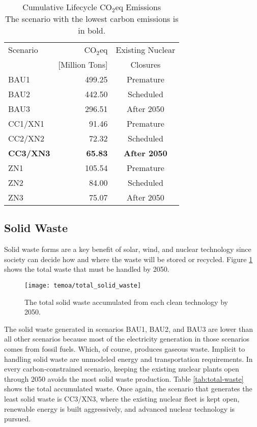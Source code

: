 \begin{table}[H]
  \centering
  \caption{Cumulative Lifecycle CO$_2$eq Emissions\\The scenario with the
  lowest carbon emissions is in bold.}
  \label{tab:co2eq-cumulative}
  \begin{tabular}{lrc}
    \hline
    Scenario & CO$_2$eq & Existing Nuclear \\
    & [Million Tons]& Closures \\
    \hline
    BAU1 & 499.25& Premature\\
    BAU2 & 442.50& Scheduled\\
    BAU3 & 296.51& After 2050\\
    CC1/XN1 & 91.46 & Premature\\
    CC2/XN2 & 72.32& Scheduled\\
    \textbf{CC3/XN3} & \textbf{65.83}& \textbf{After 2050}\\
    ZN1 & 105.54& Premature\\
    ZN2 & 84.00& Scheduled\\
    ZN3 & 75.07& After 2050\\
    \hline
  \end{tabular}
\end{table}

\subsection{Solid Waste}

Solid waste forms are a key benefit of solar, wind, and nuclear technology since
society can decide how and where the waste will be stored or recycled. Figure
\ref{fig:total-waste} shows the total waste that must be handled by 2050.

\begin{figure}[H]
  \centering
  \texttt{[image: temoa/total\_solid\_waste]}
  \caption{The total solid waste accumulated from each clean technology by
  2050.}
  \label{fig:total-waste}
\end{figure}

The solid waste generated in scenarios BAU1, BAU2, and BAU3 are lower than all
other scenarios because most of the electricity generation in those scenarios
comes from fossil fuels. Which, of course, produces gaseous waste. Implicit to
handling solid waste are unmodeled energy and transportation requirements.
In every carbon-constrained scenario, keeping the existing nuclear plants open
through 2050 avoids the most solid waste production. Table \ref{tab:total-waste}
shows the total accumulated waste. Once again, the scenario that generates the
least solid waste is CC3/XN3, where the existing nuclear fleet is kept open,
renewable energy is built aggressively, and advanced nuclear technology is
pursued.

